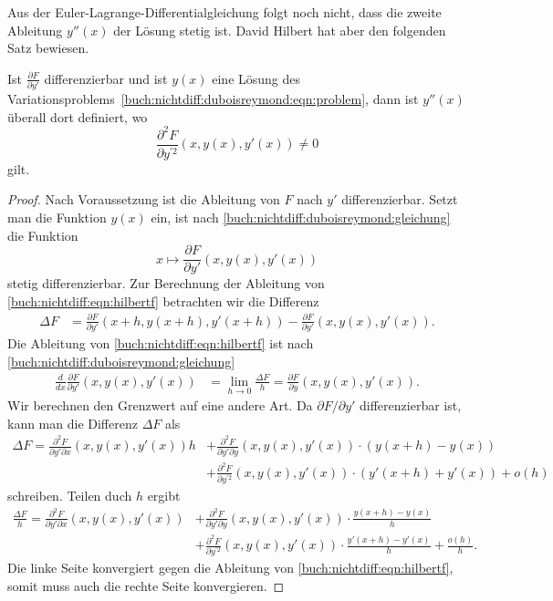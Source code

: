 Aus der Euler-Lagrange-Differentialgleichung folgt noch nicht, dass
die zweite Ableitung $y''(x)$ der Lösung stetig ist.
David Hilbert hat aber den folgenden Satz bewiesen.

\begin{satz}
Ist $\frac{\partial F}{\partial y'}$ differenzierbar und ist $y(x)$ eine
Lösung des Variationsproblems~\eqref{buch:nichtdiff:duboisreymond:eqn:problem},
dann ist $y''(x)$ überall dort definiert, wo
\begin{equation}
\frac{\partial^2 F}{\partial y^{\prime 2}}(x,y(x),y'(x)) \ne 0
\label{buch:nichtdiff:duboysreymond:eqn:positiv}
\end{equation}
gilt.
\end{satz}

\begin{proof}
Nach Voraussetzung ist die Ableitung von $F$ nach $y'$ differenzierbar.
Setzt man die Funktion $y(x)$ ein, ist nach 
\eqref{buch:nichtdiff:duboisreymond:gleichung}
die Funktion
\begin{equation}
x\mapsto
\frac{\partial F}{\partial y'}(x,y(x),y'(x))
\label{buch:nichtdiff:eqn:hilbertf}
\end{equation}
stetig differenzierbar.
Zur Berechnung der Ableitung von \eqref{buch:nichtdiff:eqn:hilbertf}
betrachten wir die Differenz
\begin{align*}
\Delta F
&=
\frac{\partial F}{\partial y'}(x+h,y(x+h),y'(x+h))
-
\frac{\partial F}{\partial y'}(x,y(x),y'(x)).
\end{align*}
Die Ableitung von \eqref{buch:nichtdiff:eqn:hilbertf} ist
nach \eqref{buch:nichtdiff:duboisreymond:gleichung}
\begin{align*}
\frac{d}{dx}
\frac{\partial F}{\partial y'}(x,y(x),y'(x))
&=
\lim_{h\to 0}
\frac{\Delta F}{h}
=
\frac{\partial F}{\partial y}(x,y(x),y'(x)).
\end{align*}
Wir berechnen den Grenzwert auf eine andere Art.
Da $\partial F/\partial y'$ differenzierbar ist, kann man die Differenz
$\Delta F$ als
\begin{align*}
\Delta F
=
\frac{\partial^2 F}{\partial y'\partial x}(x,y(x),y'(x)) h
&+
\frac{\partial^2 F}{\partial y'\partial y}(x,y(x),y'(x)) \cdot (y(x+h)-y(x))
\\
&+
\frac{\partial^2 F}{\partial y^{\prime 2}}(x,y(x),y'(x)) \cdot (y'(x+h)+y'(x))
+
o(h)
\end{align*}
schreiben.
Teilen duch $h$ ergibt
\begin{align}
\frac{\Delta F}{h}
=
\frac{\partial^2 F}{\partial y'\partial x}(x,y(x),y'(x))
&+
\frac{\partial^2 F}{\partial y'\partial y}(x,y(x),y'(x))
\cdot
\frac{y(x+h)-y(x)}{h}
\label{buch:nichtdiff:eqn:hilbertlim1}
\\
&+
\frac{\partial^2 F}{\partial y^{\prime 2}}(x,y(x),y'(x))
\cdot
\frac{y'(x+h)-y'(x)}{h}
+
\frac{o(h)}{h}.
\label{buch:nichtdiff:eqn:hilbertlim2}
\end{align}
Die linke Seite konvergiert gegen die Ableitung von
\eqref{buch:nichtdiff:eqn:hilbertf}, somit muss auch die rechte Seite
konvergieren.


\end{proof}
